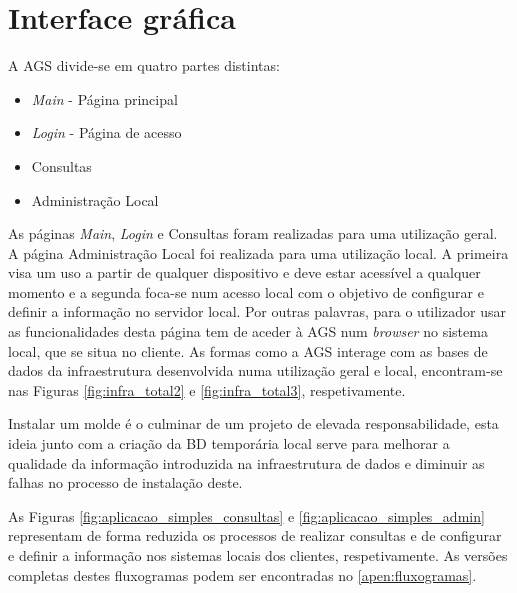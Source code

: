 \documentclass[11pt,twoside,a4paper]{report}
\begin{document}
\section{Interface gráfica}
A AGS divide-se em quatro partes distintas:
\begin{itemize}[noitemsep]
	\item \textit{Main} - Página principal
	\item \textit{Login} - Página de acesso
	\item Consultas
	\item Administração Local
\end{itemize}
As páginas \textit{Main}, \textit{Login} e Consultas foram realizadas para uma utilização geral. A página Administração Local foi realizada para uma utilização local. A primeira visa um uso a partir de qualquer dispositivo e deve estar acessível a qualquer momento e a segunda foca-se num acesso local com o objetivo de configurar e definir a informação no servidor local. Por outras palavras, para o utilizador usar as funcionalidades desta página tem de aceder à AGS num \textit{browser} no sistema local, que se situa no cliente. As formas como a AGS interage com as bases de dados da infraestrutura desenvolvida numa utilização geral e local, encontram-se nas Figuras \ref{fig:infra_total2} e \ref{fig:infra_total3}, respetivamente.\par 
Instalar um molde é o culminar de um projeto de elevada responsabilidade, esta ideia junto com a criação da BD temporária local serve para melhorar a qualidade da informação introduzida na infraestrutura de dados e diminuir as falhas no processo de instalação deste.\par
As Figuras \ref{fig:aplicacao_simples_consultas} e \ref{fig:aplicacao_simples_admin} representam de forma reduzida os processos de realizar consultas e de configurar e definir a informação nos sistemas locais dos clientes, respetivamente. As versões completas destes fluxogramas podem ser encontradas no \autoref{apen:fluxogramas}.\par
\end{document}
